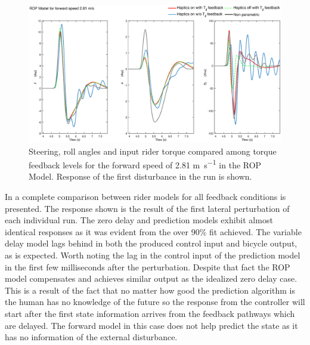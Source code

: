 \begin{figure}[!h]
    \centering
    \captionsetup{justification=centering,margin=2cm}

    \includegraphics[width=\textwidth]{images/fb_compare_plots/ROP_fb_compare28.eps}
        \caption{Steering, roll angles and input rider torque compared among torque feedback levels  for the forward speed of 2.81 \si{\meter\per\second} in the ROP Model. Response of the first disturbance in the run is shown.}
    \label{fig:paper10}
\end{figure}

In   a complete comparison between rider models for all feedback conditions is presented. The response shown is the result of the first lateral perturbation of each individual run. The zero delay and prediction models exhibit almost identical responses as it was evident from the over 90\% fit achieved. The variable delay model lags behind in both the produced control input and bicycle output, as is expected. Worth noting the lag in the control input of the prediction model in the first few milliseconds after the perturbation. Despite that fact the ROP model compensates and achieves similar output as the idealized zero delay case. This is a result of the fact that no matter how good the prediction algorithm is the human has no knowledge of the future so the response from the controller will start after the first state information arrives from the feedback pathways which are delayed. The forward model in this case does not help predict the state as it has no information of the external disturbance. 





